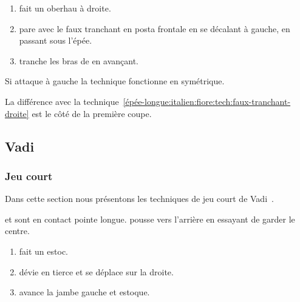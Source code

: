 \begin{technique}
\label{épée-longue:italien:fiore:tech:posta-frontale-faux-tranchant}

\begin{enumerate}
	\item \A fait un oberhau à droite.
	\item \D pare avec le faux tranchant en posta frontale en se décalant à gauche, en passant sous l'épée.
	\item \D tranche les bras de \A en avançant.
\end{enumerate}

Si \A attaque à gauche la technique fonctionne en symétrique.

La différence avec la technique~\ref{épée-longue:italien:fiore:tech:faux-tranchant-droite} est le côté de la première coupe.

\end{technique}


\subsection{Vadi}


\subsubsection{Jeu court}


Dans cette section nous présentons les techniques de jeu court de Vadi~\cite{Vadi:Petit:2013:EpeeLongue}.


\begin{exercice}
\A et \D sont en contact pointe longue.
\A pousse \D vers l'arrière en essayant de garder le centre.

\end{exercice}


\begin{technique}

\begin{enumerate}
	\item \A fait un estoc.
	\item \D dévie en tierce et se déplace sur la droite.
	\item \D avance la jambe gauche et estoque.
\end{enumerate}
\end{technique}


